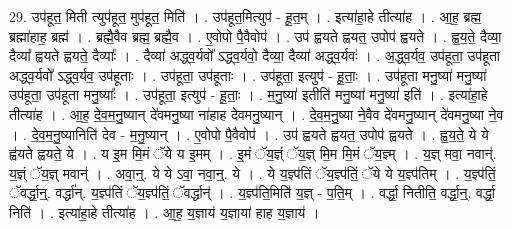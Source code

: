 \documentclass[17pt]{extarticle}
\begin{document}
29. उप॑हूत॒ मिती त्युप॑हूत॒ मुप॑हूत॒ मिति॑ । . उप॑हूत॒मित्युप॑ - हू॒त॒म् । . इत्या॑हा॒हे तीत्या॑ह । . आ॒ह॒ ब्रह्म॒ ब्रह्मा॑हाह॒ ब्रह्म॑ । . ब्रह्मै॒वैव ब्रह्म॒ ब्रह्मै॒व । . ए॒वोपो पै॒वैवोप॑ । . उप॑ ह्वयते ह्वयत॒ उपोप॑ ह्वयते । . ह्व॒य॒ते॒ दैव्या॒ दैव्या᳚ ह्वयते ह्वयते॒ दैव्याः᳚ । . दैव्या॑ अद्ध्व॒र्यवो᳚ ऽद्ध्व॒र्यवो॒ दैव्या॒ दैव्या॑ अद्ध्व॒र्यवः॑ । . अ॒द्ध्व॒र्यव॒ उप॑हूता॒ उप॑हूता अद्ध्व॒र्यवो᳚ ऽद्ध्व॒र्यव॒ उप॑हूताः । . उप॑हूता॒ उप॑हूताः । . उप॑हूता॒ इत्युप॑ - हू॒ताः॒ । . उप॑हूता मनु॒ष्या॑ मनु॒ष्या॑ उप॑हूता॒ उप॑हूता मनु॒ष्याः᳚ । . उप॑हूता॒ इत्युप॑ - हू॒ताः॒ । . म॒नु॒ष्या॑ इतीति॑ मनु॒ष्या॑ मनु॒ष्या॑ इति॑ । . इत्या॑हा॒हे तीत्या॑ह । . आ॒ह॒ दे॒व॒म॒नु॒ष्यान् दे॑वमनु॒ष्या ना॑हाह देवमनु॒ष्यान् । . दे॒व॒म॒नु॒ष्या ने॒वैव दे॑वमनु॒ष्यान् दे॑वमनु॒ष्या ने॒व । . दे॒व॒म॒नु॒ष्यानिति॑ देव - म॒नु॒ष्यान् । . ए॒वोपो पै॒वैवोप॑ । . उप॑ ह्वयते ह्वयत॒ उपोप॑ ह्वयते । . ह्व॒य॒ते॒ ये ये ह्व॑यते ह्वयते॒ ये । . य इ॒म मि॒मं ॅये य इ॒मम् । . इ॒मं ॅय॒ज्ञ्ं ॅय॒ज्ञ् मि॒म मि॒मं ॅय॒ज्ञ्म् । . य॒ज्ञ् मवा॒ नवान्॑. य॒ज्ञ्ं ॅय॒ज्ञ् मवान्॑ । . अवा॒न्॒. ये ये ऽवा॒ नवा॒न्॒. ये । . ये य॒ज्ञ्प॑तिं ॅय॒ज्ञ्प॑तिं॒ ॅये ये य॒ज्ञ्प॑तिम् । . य॒ज्ञ्प॑तिं॒ ॅवर्द्धा॒न्॒. वर्द्धा॑न्. य॒ज्ञ्प॑तिं ॅय॒ज्ञ्प॑तिं॒ ॅवर्द्धान्॑ । . य॒ज्ञ्प॑ति॒मिति॑ य॒ज्ञ् - प॒ति॒म् । . वर्द्धा॒ नितीति॒ वर्द्धा॒न्॒. वर्द्धा॒ निति॑ । . इत्या॑हा॒हे तीत्या॑ह । . आ॒ह॒ य॒ज्ञाय॑ य॒ज्ञाया॑ हाह य॒ज्ञाय॑ । \newline
\end{document}
